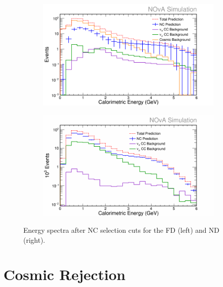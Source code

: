 \begin{figure}[h]
  \centering
  \begin{subfigure}{.48\textwidth}
    \centering
    \includegraphics[width=1\linewidth]{figures/RecoE4FD.png}
  \end{subfigure}
  \begin{subfigure}{.48\textwidth}
    \centering
    \includegraphics[width=1\linewidth]{figures/RecoE4ND.png}
  \end{subfigure}
  \caption[Energy Spectra After NC Selection Cuts]{Energy spectra after NC selection cuts for the FD (left) and ND (right).}
  \label{fig:NP1NCSel}
\end{figure}

\section{Cosmic Rejection}

